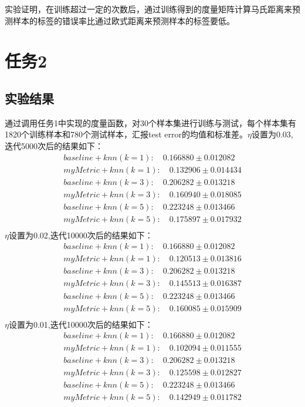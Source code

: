 \documentclass[a4paper,UTF8]{article}
\theoremstyle{definition}
\begin{document}
		实验证明，在训练超过一定的次数后，通过训练得到的度量矩阵计算马氏距离来预测样本的标签的错误率比通过欧式距离来预测样本的标签要低。
		
\section*{任务2}
	\subsection*{实验结果}
		通过调用任务1中实现的度量函数，对30个样本集进行训练与测试，每个样本集有1820个训练样本和780个测试样本，汇报test error的均值和标准差。$\eta$设置为0.03,迭代5000次后的结果如下：
		\begin{align*}
		baseline+knn(k=1): \quad	0.166880 ± 0.012082 \\
		myMetric+knn(k=1): \quad	0.132906 ± 0.014434 \\
		baseline+knn(k=3): \quad	0.206282 ± 0.013218 \\
		myMetric+knn(k=3): \quad	0.160940 ± 0.018085 \\
		baseline+knn(k=5): \quad	0.223248 ± 0.013466 \\
		myMetric+knn(k=5): \quad	0.175897 ± 0.017932 \\
		\end{align*}
		$\eta$设置为0.02,迭代10000次后的结果如下：
		\begin{align*}
		baseline+knn(k=1): \quad	0.166880 ± 0.012082\\
		myMetric+knn(k=1): \quad	0.120513 ± 0.013816\\
		baseline+knn(k=3): \quad	0.206282 ± 0.013218\\
		myMetric+knn(k=3): \quad	0.145513 ± 0.016387\\
		baseline+knn(k=5): \quad	0.223248 ± 0.013466\\
		myMetric+knn(k=5): \quad	0.160085 ± 0.015909\\
		\end{align*}
		$\eta$设置为0.01,迭代10000次后的结果如下：
		\begin{align*}
		baseline+knn(k=1): \quad	0.166880 ± 0.012082\\
		myMetric+knn(k=1): \quad	0.102094 ± 0.011555\\
		baseline+knn(k=3): \quad	0.206282 ± 0.013218\\
		myMetric+knn(k=3): \quad	0.125598 ± 0.012827\\
		baseline+knn(k=5): \quad	0.223248 ± 0.013466\\
		myMetric+knn(k=5): \quad	0.142949 ± 0.011782\\
		\end{align*}
\end{document}
